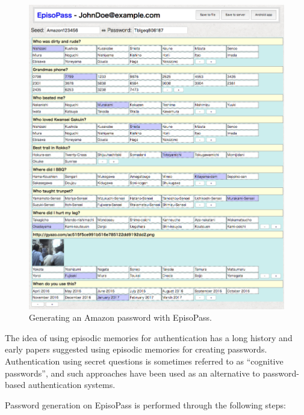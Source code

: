\documentclass[runningheads,a4paper]{llncs}
\begin{document}
\begin{figure}
\centering
\includegraphics[width=1.0\columnwidth]{figures/4d13e6804ba790624c1f8e2b8255bde5}
\caption{Generating an Amazon password with EpisoPass.}
\label{web1}
\end{figure}


The idea of using episodic memories for authentication has a long history and early papers suggested using episodic memories for creating passwords. Authentication using secret questions is sometimes referred to as ``cognitive passwords''\cite{Zviran:1990:UAC:100512.100538}, and such approaches have been used as an alternative to password-based authentication systems.
%

Password generation on EpisoPass is performed through the following steps:
\end{document}
